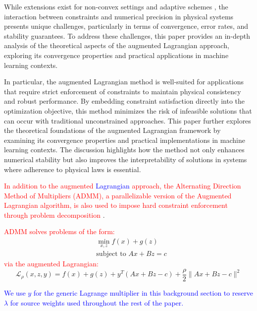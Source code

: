 \documentclass[preprint,12pt,authoryear]{elsarticle}
\begin{document}
While extensions exist for non-convex settings \cite{birgin2014practical} and adaptive schemes \cite{curtis2015adaptive}, the interaction between constraints and numerical precision in physical systems presents unique challenges, particularly in terms of convergence, error rates, and stability guarantees. To address these challenges, this paper provides an in-depth analysis of the theoretical aspects of the augmented Lagrangian approach, exploring its convergence properties and practical applications in machine learning contexts.

In particular, the augmented Lagrangian method is well-suited for applications that require strict enforcement of constraints to maintain physical consistency and robust performance. By embedding constraint satisfaction directly into the optimization objective, this method minimizes the risk of infeasible solutions that can occur with traditional unconstrained approaches. This paper further explores the theoretical foundations of the augmented Lagrangian framework by examining its convergence properties and practical implementations in machine learning contexts. The discussion highlights how the method not only enhances numerical stability but also improves the interpretability of solutions in systems where adherence to physical laws is essential.

\textcolor{red}{In addition to the augmented \textcolor{blue}{Lagrangian} approach, the Alternating Direction Method of Multipliers (ADMM), a parallelizable version of the Augmented Lagrangian algorithm, is also used to impose hard constraint enforcement through problem decomposition} \cite{zeng2021admm_constrained_problems_convergence_saturation, chen2017note_admm_constrained_problems, boyd2011distributed}.

\textcolor{red}{ADMM solves problems of the form:}
\[
\begin{aligned}
& \min_{x, z} f(x) + g(z) \\
& \text{subject to } Ax + Bz = c
\end{aligned}
\]
\textcolor{red}{via the augmented Lagrangian:}
\begin{equation}
\mathcal{L}_\rho(x, z, y) = f(x) + g(z) + y^T(Ax + Bz - c) + \frac{\rho}{2}\|Ax + Bz - c\|^2
\end{equation}

\textcolor{blue}{We use $y$ for the generic Lagrange multiplier in this background section to reserve $\lambda$ for source weights used throughout the rest of the paper.}
\end{document}
